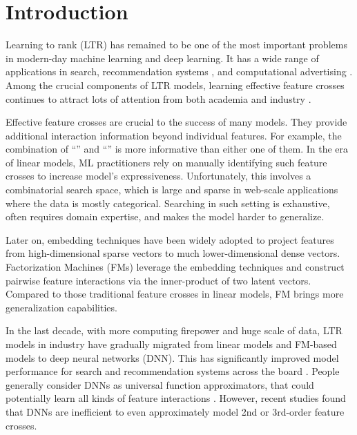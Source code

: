 \documentclass[sigconf]{acmart}
\begin{document}
\section{Introduction}

Learning to rank (LTR) \cite{liu2011learning, cao2007learning} has remained to be one of the most important problems in modern-day machine learning and deep learning. It has a wide range of applications in search, recommendation systems \cite{resnick1997recommender, herlocker2004evaluating, schafer1999recommender}, and computational advertising \cite{broder2008computational, bottou2013counterfactual}. Among the crucial components of LTR models, learning effective feature crosses continues to attract lots of attention from both academia \cite{qu2016product, lian2018xdeepfm, song2019autoint} and industry \cite{wang2017deep, cheng2016wide, guo2017deepfm, beutel2018latent, naumov2019deep}.

Effective feature crosses are crucial to the success of many models. They provide additional interaction information beyond individual features. For example, the combination of ``{}'' and ``{}'' is more informative than either one of them.
In the era of linear models, ML practitioners rely on manually identifying such feature crosses \cite{seide2011feature} to increase model's expressiveness.
Unfortunately, this involves a combinatorial search space, which is large and sparse in web-scale applications where the data is mostly categorical.
Searching in such setting is exhaustive, often requires domain expertise, and makes the model harder to generalize.

Later on, embedding techniques have been widely adopted to project features from high-dimensional sparse vectors to much lower-dimensional dense vectors. Factorization Machines (FMs) \cite{rendle2010factorization, rendle:tist2012} leverage the embedding techniques and construct pairwise feature interactions via the inner-product of two latent vectors. Compared to those traditional feature crosses in linear models, FM brings more generalization capabilities.

In the last decade, with more computing firepower and huge scale of data, LTR models in industry have gradually migrated from linear models and FM-based models to deep neural networks (DNN). This has significantly improved model performance for search and recommendation systems across the board \cite{cheng2016wide, wang2017deep, guo2017deepfm}. People generally consider DNNs as universal function approximators, that could potentially learn all kinds of feature interactions \cite{mhaskar1996neural, valiant2014learning, NIPS2016_6556}. However, recent studies \cite{beutel2018latent, wang2017deep} found that DNNs are inefficient to even approximately model 2nd or 3rd-order feature crosses.
\end{document}
